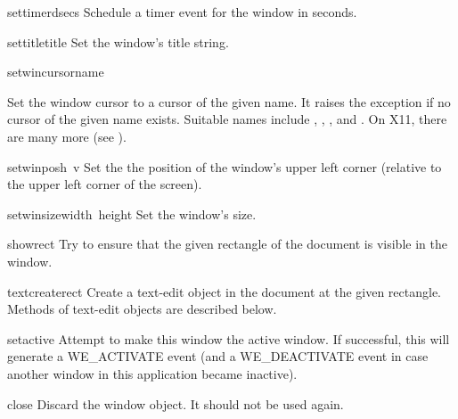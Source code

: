 \begin{funcdesc}{settimer}{dsecs}
Schedule a timer event for the window in
seconds.
\end{funcdesc}

\begin{funcdesc}{settitle}{title}
Set the window's title string.
\end{funcdesc}

\begin{funcdesc}{setwincursor}{name}
\begin{sloppypar}
Set the window cursor to a cursor of the given name.
It raises the
exception if no cursor of the given name exists.
Suitable names include
,
,
,
and
.
On X11, there are many more (see
).
\end{sloppypar}
\end{funcdesc}

\begin{funcdesc}{setwinpos}{h\, v}
Set the the position of the window's upper left corner (relative to
the upper left corner of the screen).
\end{funcdesc}

\begin{funcdesc}{setwinsize}{width\, height}
Set the window's size.
\end{funcdesc}

\begin{funcdesc}{show}{rect}
Try to ensure that the given rectangle of the document is visible in
the window.
\end{funcdesc}

\begin{funcdesc}{textcreate}{rect}
Create a text-edit object in the document at the given rectangle.
Methods of text-edit objects are described below.
\end{funcdesc}

\begin{funcdesc}{setactive}{}
Attempt to make this window the active window.  If successful, this
will generate a WE_ACTIVATE event (and a WE_DEACTIVATE event in case
another window in this application became inactive).
\end{funcdesc}

\begin{funcdesc}{close}{}
Discard the window object.  It should not be used again.
\end{funcdesc}

